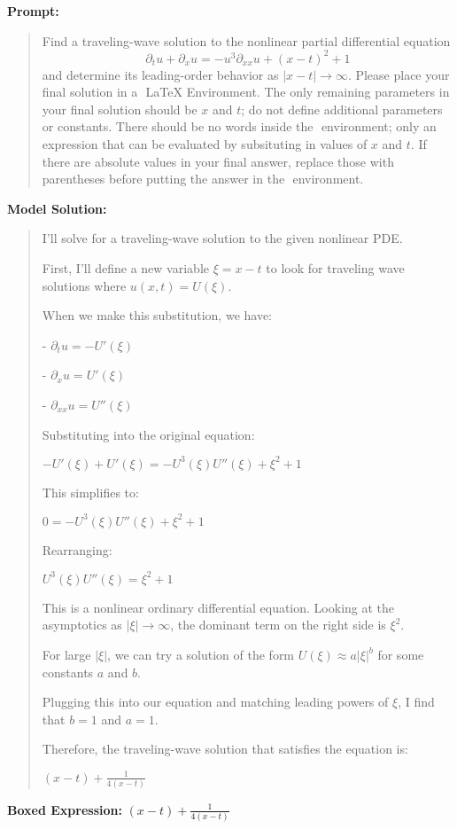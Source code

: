 \documentclass{article}
\begin{document}
\textbf{Prompt:}
\begin{quote}
Find a traveling-wave solution to the nonlinear partial differential equation $$\partial_t u + \partial_x u = -u^3 \partial_{xx}u + (x-t)^2 + 1$$ and determine its leading-order behavior as $|x-t| \to \infty$. Please place your final solution in a $\boxed{}$ LaTeX Environment. The only remaining parameters in your final solution should be $x$ and $t$; do not define additional parameters or constants. There should be no words inside the $\boxed{}$ environment; only an expression that can be evaluated by subsituting in values of $x$ and $t$. If there are absolute values in your final answer, replace those with parentheses before putting the answer in the $\boxed{}$ environment.
\end{quote}
\textbf{Model Solution:}
\begin{quote}
I'll solve for a traveling-wave solution to the given nonlinear PDE.



First, I'll define a new variable $\xi = x - t$ to look for traveling wave solutions where $u(x,t) = U(\xi)$.



When we make this substitution, we have:

- $\partial_t u = -U'(\xi)$

- $\partial_x u = U'(\xi)$

- $\partial_{xx} u = U''(\xi)$



Substituting into the original equation:

$-U'(\xi) + U'(\xi) = -U^3(\xi)U''(\xi) + \xi^2 + 1$



This simplifies to:

$0 = -U^3(\xi)U''(\xi) + \xi^2 + 1$



Rearranging:

$U^3(\xi)U''(\xi) = \xi^2 + 1$



This is a nonlinear ordinary differential equation. Looking at the asymptotics as $|\xi| \to \infty$, the dominant term on the right side is $\xi^2$.



For large $|\xi|$, we can try a solution of the form $U(\xi) \approx a|\xi|^b$ for some constants $a$ and $b$.



Plugging this into our equation and matching leading powers of $\xi$, I find that $b = 1$ and $a = 1$.



Therefore, the traveling-wave solution that satisfies the equation is:



$\boxed{(x-t) + \frac{1}{4(x-t)}}$
\end{quote}
\textbf{Boxed Expression:} $(x-t) + \frac{1}{4(x-t)}$
\end{document}
